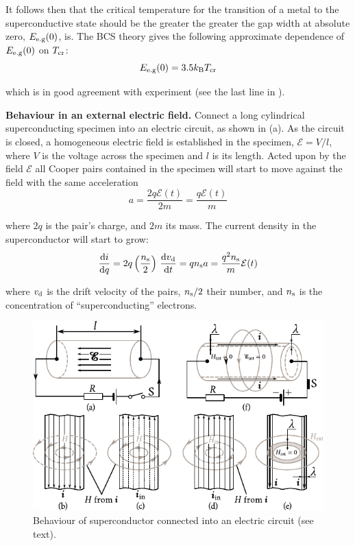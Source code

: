 It follows then that the critical temperature for the transition of a metal to the superconductive state should be the greater the greater the gap width at absolute zero, $E_{\text{e.g}}(0)$, is. The BCS theory gives the following approximate dependence of $E_{\text{e.g}}(0)$ on $T_{\text{cr}}$:
\begin{equation}\label{eq:6_53}
	E_{\text{e.g}}(0) = 3.5 k_{\text{B}} T_{\text{cr}}
\end{equation}

which is in good agreement with experiment (see the last line in ).

\textbf{Behaviour in an external electric field.} Connect a long cylindrical superconducting specimen into an electric circuit, as shown in (a). As the circuit is closed, a homogeneous electric field is established in the specimen, $\mathcal{E}=V/l$, where $V$ is the voltage across the specimen and $l$ is its length. Acted upon by the field $\mathcal{E}$ all Cooper pairs contained in the specimen will start to move against the field with the same acceleration
\begin{equation*}
	a = \frac{2 q \mathcal{E}(t)}{2m} = \frac{q\mathcal{E}(t)}{m}
\end{equation*}

\noindent
where $2q$ is the pair's charge, and $2m$ its mass.
The current density in the superconductor will start to grow:
\begin{equation*}
	\dfrac{\mathrm{d} i}{\mathrm{d} q} = 2q \left(\frac{n_{\text{s}}}{2}\right)\, \dfrac{\mathrm{d}v_{\text{d}}}{\mathrm{d} t} = q n_{\text{s}} a = \frac{q^2 n_{\text{s}}}{m} \mathcal{E}(t)
\end{equation*}

\noindent
where $v_{\text{d}}$ is the drift velocity of the pairs, $n_{\text{s}}/2$ their number, and $n_{\text{s}}$ is the concentration of ``superconducting'' electrons.

\begin{figure}[t]
	\begin{center}
		\includegraphics[scale=1.1]{figures/ch_06/fig_6_35.pdf}
		\caption[]{Behaviour of superconductor connected into an electric circuit (see text).}
		\label{fig:6_35}
	\end{center}
	\vspace{-0.7cm}
\end{figure}

